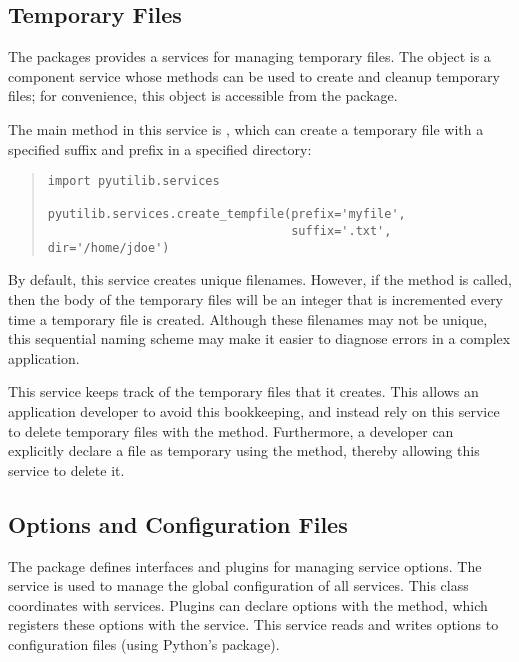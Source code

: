 \subsection{Temporary Files}

The  packages provides a services for managing temporary files.  The  object is a component service whose methods can be used to create and
cleanup temporary files;  for convenience, this object is accessible from the  package.

The main method in this service is , which can create a temporary file with a specified suffix and prefix in a specified directory:
\begin{quotation}
\begin{lstlisting}
import pyutilib.services

pyutilib.services.create_tempfile(prefix='myfile',
                                  suffix='.txt', dir='/home/jdoe')
\end{lstlisting}
\end{quotation}
By default, this service creates unique filenames.  However, if the 
method is called, then the body of the temporary files will be an integer that 
is incremented every time a temporary file is created.  Although these filenames may not
be unique, this sequential naming scheme may make it easier to diagnose errors in a
complex application.

This service keeps track of the temporary files that it creates.  This allows an application
developer to avoid this bookkeeping, and instead rely on this service to delete temporary 
files with the  method.  Furthermore, a developer can explicitly
declare a file as temporary using the  method, thereby allowing this
service to delete it.


\subsection{Options and Configuration Files}

The  package defines interfaces and plugins
for managing service options. The  service is used to manage
the global configuration of all services. This class coordinates with
 services. Plugins can declare options with the 
method, which registers these options with the  service. This
service reads and writes options to configuration files (using Python's
 package).

